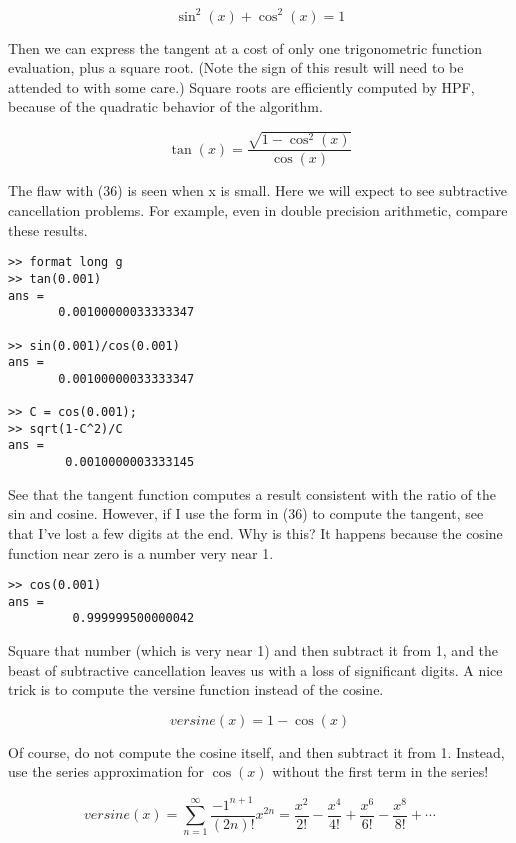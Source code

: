 \documentclass[a4paper,12pt]{article}
\begin{document}
\begin{equation}
   \sin^2(x) + \cos^2(x) = 1
\end{equation}

Then we can express the tangent at a cost of only one trigonometric function evaluation, plus a square root. (Note the sign of this result will need to be attended to with some care.) Square roots are efficiently computed by HPF, because of the quadratic behavior of the algorithm.

\begin{equation}
   \tan(x) = \frac{\sqrt{1 - \cos^2(x)}}{\cos(x)}
\end{equation}

The flaw with (36) is seen when x is small. Here we will expect to see subtractive cancellation problems. For example, even in double precision arithmetic, compare these results.

\begin{lstlisting}
>> format long g
>> tan(0.001)
ans =
       0.00100000033333347

>> sin(0.001)/cos(0.001)
ans =
       0.00100000033333347

>> C = cos(0.001);
>> sqrt(1-C^2)/C
ans =
        0.0010000003333145
\end{lstlisting}

See that the tangent function computes a result consistent with the ratio of the sin and cosine. However, if I use the form in (36) to compute the tangent, see that I've lost a few digits at the end. Why is this? It happens because the cosine function near zero is a number very near 1.

\begin{lstlisting}
>> cos(0.001)
ans =
         0.999999500000042
\end{lstlisting}

Square that number (which is very near 1) and then subtract it from 1, and the beast of subtractive cancellation leaves us with a loss of significant digits. A nice trick is to compute the versine function instead of the cosine.

\begin{equation}
   versine(x) = 1 - \cos(x)
\end{equation}

Of course, do not compute the cosine itself, and then subtract it from 1. Instead, use the series approximation for $\cos(x)$ without the first term in the series!

\begin{equation}
   versine(x) = \sum_{n = 1}^{\infty}{\frac{-1^{n+1}}{(2n)!}}x^{2n} = \frac{x^2}{2!} - \frac{x^4}{4!} + \frac{x^6}{6!} - \frac{x^8}{8!} + \cdots
\end{equation}
\end{document}
